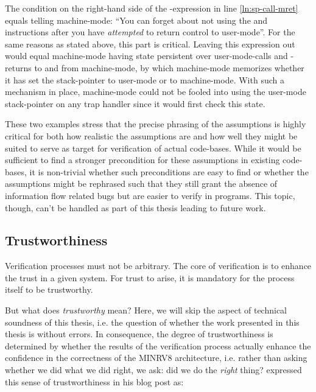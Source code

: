 The condition  on the right-hand side of the -expression in line \ref{ln:sp-call-mret} equals telling machine-mode: \enquote{You can forget about not using the  and  instructions after you have \textit{attempted} to return control to user-mode}.
For the same reasons as stated above, this part is critical.
Leaving this expression out would equal machine-mode having state persistent over user-mode-calls and -returns to and from machine-mode, by which machine-mode memorizes whether it has set the stack-pointer to user-mode or to machine-mode.
With such a mechanism in place, machine-mode could not be fooled into using the user-mode stack-pointer on any trap handler since it would first check this state.

These two examples stress that the precise phrasing of the assumptions is highly critical for both how realistic the assumptions are and how well they might be suited to serve as target for verification of actual code-bases.
While it would be sufficient to find a stronger precondition for these assumptions in existing code-bases, it is non-trivial whether such preconditions are easy to find or whether the assumptions might be rephrased such that they still grant the absence of information flow related bugs but are easier to verify in programs.
This topic, though, can't be handled as part of this thesis leading to future work.

\subsection{Trustworthiness}
\label{sec:trustworthiness}

Verification processes must not be arbitrary.
The core of verification is to enhance the trust in a given system.
For trust to arise, it is mandatory for the process itself to be trustworthy.

But what does \textit{trustworthy} mean?
Here, we will skip the aspect of technical soundness of this thesis, i.e. the question of whether the work presented in this thesis is without errors.
In consequence, the degree of trustworthiness is determined by whether the results of the verification process actually enhance the confidence in the correctness of the MINRV8 architecture, i.e. rather than asking whether we did what we did right, we ask: did we do the \textit{right} thing?
\citeauthor{Piano} expressed this sense of trustworthiness in his blog post  as:

